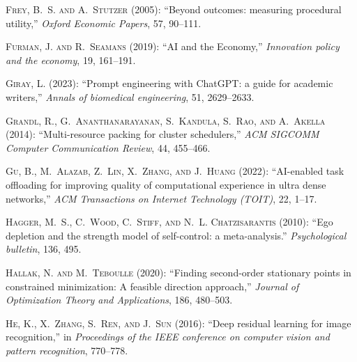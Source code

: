 \documentclass[11pt]{article}
\theoremstyle{definition}
\theoremstyle{remark}
\begin{document}
\begin{thebibliography}{70}
\textsc{Frey, B.~S. and A.~Stutzer} (2005): \enquote{Beyond outcomes: measuring procedural utility,} \emph{Oxford Economic Papers}, 57, 90--111.

\textsc{Furman, J. and R.~Seamans} (2019): \enquote{AI and the Economy,} \emph{Innovation policy and the economy}, 19, 161--191.

\textsc{Giray, L.} (2023): \enquote{Prompt engineering with ChatGPT: a guide for academic writers,} \emph{Annals of biomedical engineering}, 51, 2629--2633.

\textsc{Grandl, R., G.~Ananthanarayanan, S.~Kandula, S.~Rao, and A.~Akella} (2014): \enquote{Multi-resource packing for cluster schedulers,} \emph{ACM SIGCOMM Computer Communication Review}, 44, 455--466.

\textsc{Gu, B., M.~Alazab, Z.~Lin, X.~Zhang, and J.~Huang} (2022): \enquote{AI-enabled task offloading for improving quality of computational experience in ultra dense networks,} \emph{ACM Transactions on Internet Technology (TOIT)}, 22, 1--17.

\textsc{Hagger, M.~S., C.~Wood, C.~Stiff, and N.~L. Chatzisarantis} (2010): \enquote{Ego depletion and the strength model of self-control: a meta-analysis.} \emph{Psychological bulletin}, 136, 495.

\textsc{Hallak, N. and M.~Teboulle} (2020): \enquote{Finding second-order stationary points in constrained minimization: A feasible direction approach,} \emph{Journal of Optimization Theory and Applications}, 186, 480--503.

\textsc{He, K., X.~Zhang, S.~Ren, and J.~Sun} (2016): \enquote{Deep residual learning for image recognition,} in \emph{Proceedings of the IEEE conference on computer vision and pattern recognition}, 770--778.


\end{thebibliography}
\end{document}
